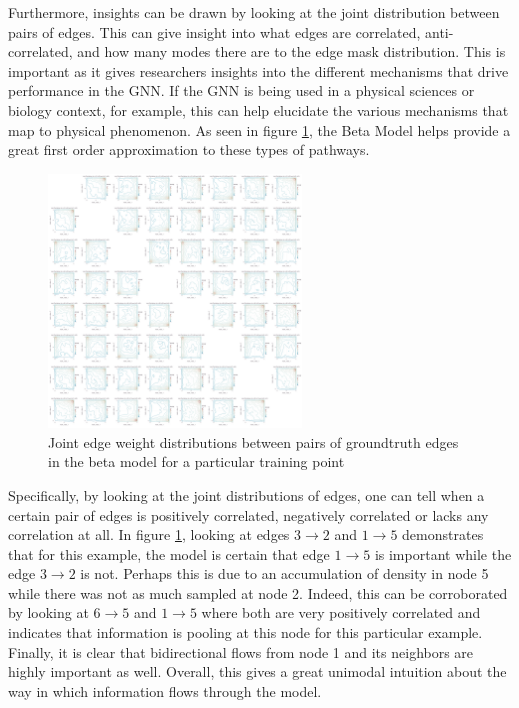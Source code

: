 Furthermore, insights can be drawn by looking at the joint distribution between pairs of edges. This can give insight into what edges are correlated, anti-correlated, and how many modes there are to the edge mask distribution. This is important as it gives researchers insights into the different mechanisms that drive performance in the GNN. If the GNN is being used in a physical sciences or biology context, for example, this can help elucidate the various mechanisms that map to physical phenomenon. As seen in figure \ref{fig:tree-model-beta-joint}, the Beta Model helps provide a great first order approximation to these types of pathways.
\begin{figure}[htb]
	\centering
	\includegraphics[width=0.6\textwidth]{images/tree-model-beta-joint.pdf}
	\caption{Joint edge weight distributions between pairs of groundtruth edges in the beta model for a particular training point}
	\label{fig:tree-model-beta-joint}
\end{figure}

Specifically, by looking at the joint distributions of edges, one can tell when a certain pair of edges is positively correlated, negatively correlated or lacks any correlation at all. In figure \ref{fig:tree-model-beta-joint}, looking at edges $3 \rightarrow 2$ and $1 \rightarrow 5$ demonstrates that for this example, the model is certain that edge $1 \rightarrow 5$ is important while the edge $3 \rightarrow 2$ is not. Perhaps this is due to an accumulation of density in node 5 while there was not as much sampled at node 2. Indeed, this can be corroborated by looking at $6 \rightarrow 5$ and $1 \rightarrow 5$ where both are very positively correlated and indicates that information is pooling at this node for this particular example. Finally, it is clear that bidirectional flows from node 1 and its neighbors are highly important as well. Overall, this gives a great unimodal intuition about the way in which information flows through the model.

